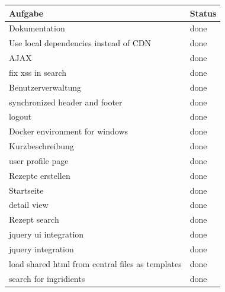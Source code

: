\documentclass{article}
\begin{document}
\begin{center}
\begin{table}[]
\centering
\begin{tabular}{@{}|l|l|@{}}
\hline
Aufgabe                                                                 & Status    \\ \hline
Dokumentation                                                           & done      \\ 
Use local dependencies instead of CDN                                   & done      \\ 
AJAX                                                                    & done      \\ 
fix xss in search                                                       & done      \\ 
Benutzerverwaltung                                                      & done      \\ 
synchronized header and footer                                          & done      \\ 
logout                                                                  & done      \\ 
Docker environment for windows                                          & done      \\ 
Kurzbeschreibung                                                        & done      \\ 
user profile page                                                       & done      \\ 
Rezepte erstellen                                                       & done      \\ 
Startseite                                                              & done      \\ 
detail view                                                             & done      \\ 
Rezept search                                                           & done      \\ 
jquery ui integration                                                   & done      \\ 
jquery integration                                                      & done      \\ 
load shared html from central files as templates                        & done      \\ 
search for ingridients                                                  & done      \\ 

\end{tabular}
\end{table}
\end{center}
\end{document}
